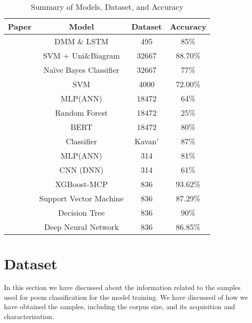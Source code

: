 \documentclass[conference]{IEEEtran}
\begin{document}
\begin{table}[h]
\centering
\caption{Summary of Models, Dataset, and Accuracy}
\label{table:models}
\begin{tabular}{|c|c|c|c|}
\hline
\textbf{Paper} & \textbf{Model} & \textbf{Dataset} & \textbf{Accuracy} \\
\hline
\cite{b1} & DMM \& LSTM  & 495 & 85\% \\
\hline
\cite{b2} & SVM + Uni\&Biagram  & 32667 & 88.70\% \\
\cite{b2} & Naïve Bayes Classifier  & 32667 & 77\% \\
\cite{b3} & SVM  & 4000 & 72.00\% \\
\hline
\cite{b4} & MLP(ANN)  & 18472 & 64\% \\
\cite{b4} & Random Forest  & 18472 & 25\% \\
\cite{b4} & BERT  & 18472 & 80\% \\
\hline
\cite{b5} & Classifier  & Kavan' & 87\% \\
\hline
\cite{b6} & MLP(ANN)  & 314 & 81\% \\
\cite{b6} & CNN (DNN)  & 314 & 61\% \\
\hline
\cite{b7} & XGBoost-MCP  & 836 & 93.62\% \\
\cite{b7} & Support Vector Machine  & 836 & 87.29\% \\
\cite{b7} & Decision Tree  & 836 & 90\% \\
\cite{b7} & Deep Neural Network  & 836 & 86.85\% \\
\hline
\end{tabular}
\end{table}

\section{Dataset}
In this section we have discussed about the information related to the samples used for poem classification for the model training. We have discussed of how we have obtained the samples, including the corpus size, and its acquisition and characterization.
\end{document}
